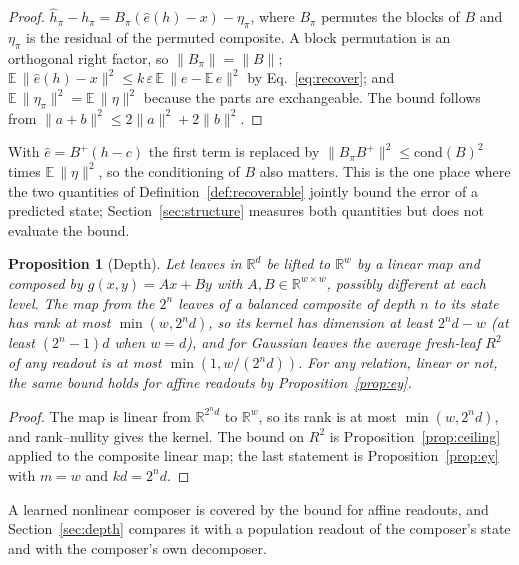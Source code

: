 \documentclass[10pt]{article}
\theoremstyle{plain}
\newtheorem{proposition}{Proposition}
\theoremstyle{remark}
\newcommand{\R}{\mathbb{R}}
\begin{document}
\begin{proof}
$\hat{h}_\pi - h_\pi = B_\pi(\hat{e}(h) - x) - \eta_\pi$, where $B_\pi$ permutes the blocks of $B$ and $\eta_\pi$ is the residual of the permuted composite. A block permutation is an orthogonal right factor, so $\lVert B_\pi \rVert = \lVert B \rVert$; $\mathbb{E}\,\lVert \hat{e}(h) - x \rVert^2 \le k\,\varepsilon\,\mathbb{E}\,\lVert e - \mathbb{E}\,e\rVert^2$ by Eq.~\eqref{eq:recover}; and $\mathbb{E}\,\lVert \eta_\pi \rVert^2 = \mathbb{E}\,\lVert \eta \rVert^2$ because the parts are exchangeable. The bound follows from $\lVert a + b \rVert^2 \le 2\lVert a \rVert^2 + 2\lVert b \rVert^2$.
\end{proof}

\noindent
With $\hat{e} = B^{+}(h - c)$ the first term is replaced by $\lVert B_\pi B^{+} \rVert^2 \le \mathrm{cond}(B)^2$ times $\mathbb{E}\,\lVert \eta \rVert^2$, so the conditioning of $B$ also matters. This is the one place where the two quantities of Definition~\ref{def:recoverable} jointly bound the error of a predicted state; Section~\ref{sec:structure} measures both quantities but does not evaluate the bound.

\begin{proposition}[Depth]
\label{prop:depth}
Let leaves in $\R^d$ be lifted to $\R^w$ by a linear map and composed by $g(x, y) = Ax + By$ with $A, B \in \R^{w \times w}$, possibly different at each level. The map from the $2^n$ leaves of a balanced composite of depth $n$ to its state has rank at most $\min(w, 2^n d)$, so its kernel has dimension at least $2^n d - w$ (at least $(2^n - 1)d$ when $w = d$), and for Gaussian leaves the average fresh-leaf $R^2$ of any readout is at most $\min(1, w/(2^n d))$. For any relation, linear or not, the same bound holds for affine readouts by Proposition~\ref{prop:ey}.
\end{proposition}

\begin{proof}
The map is linear from $\R^{2^n d}$ to $\R^w$, so its rank is at most $\min(w, 2^n d)$, and rank--nullity gives the kernel. The bound on $R^2$ is Proposition~\ref{prop:ceiling} applied to the composite linear map; the last statement is Proposition~\ref{prop:ey} with $m = w$ and $kd = 2^n d$.
\end{proof}

\noindent
A learned nonlinear composer is covered by the bound for affine readouts, and Section~\ref{sec:depth} compares it with a population readout of the composer's state and with the composer's own decomposer.
\end{document}
